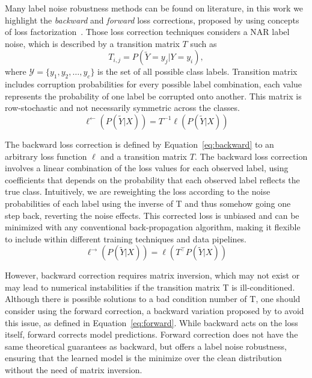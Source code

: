 Many label noise robustness methods can be found on literature, in this work we highlight the \textit{backward} and \textit{forward} loss corrections, proposed by \cite{Patrini2017} using concepts of loss factorization~\citep{Patrini2016}. Those loss correction techniques considers a NAR label noise, which is described by a transition matrix $T$ such as
\begin{equation}
    T_{i,j} = P(\tilde{Y} = y_j|Y = y_i),
\end{equation}
where $\mathcal{Y} = \{y_1, y_2, \ldots, y_c\}$ is the set of all possible class labels. Transition matrix includes corruption probabilities for every possible label combination, each value represents the probability of one label be corrupted onto another. This matrix is row-stochastic and not necessarily symmetric across the classes.
\begin{equation} \label{eq:backward}
    \ell^{\leftarrow}(P(\tilde{Y}|X)) = T^{-1} \ell(P(\tilde{Y}|X))
\end{equation}

The backward loss correction is defined by Equation~\ref{eq:backward} to an arbitrary loss function $\ell$ and a transition matrix $T$. The backward loss correction involves a linear combination of the loss values for each observed label, using coefficients that depends on the probability that each observed label reflects the true class. Intuitively, we are reweighting the loss according to the noise probabilities of each label using the inverse of T and thus somehow going one step back, reverting the noise effects. This corrected loss is unbiased and can be minimized with any conventional back-propagation algorithm, making it flexible to include within different training techniques and data pipelines.
\begin{equation} \label{eq:forward}
    \ell^{\rightarrow}(P(\tilde{Y}|X)) = \ell(T^{\top} P(\tilde{Y}|X))
\end{equation}

However, backward correction requires matrix inversion, which may not exist or may lead to numerical instabilities if the transition matrix T is ill-conditioned. Although there is possible solutions to a bad condition number of T, one should consider using the forward correction, a backward variation proposed by \cite{Patrini2017} to avoid this issue, as defined in Equation~\ref{eq:forward}. While backward acts on the loss itself, forward corrects model predictions. Forward correction does not have the same theoretical guarantees as backward, but offers a label noise robustness, ensuring that the learned model is the minimize over the clean distribution without the need of matrix inversion.

